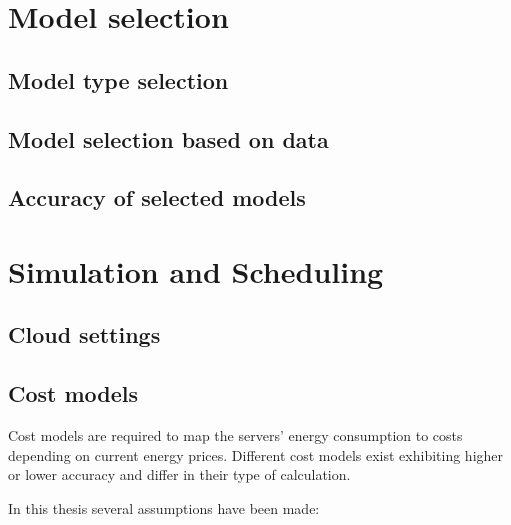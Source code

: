 \section{Model selection}

\subsection{Model type selection}

\subsection{Model selection based on data}

\subsection{Accuracy of selected models}


\section{Simulation and Scheduling}

\subsection{Cloud settings}

\subsection{Cost models}


Cost models are required to map the servers' energy consumption to costs depending on current energy prices. Different cost models exist exhibiting higher or lower accuracy and differ in their type of calculation. 

In this thesis several assumptions have been made: 


